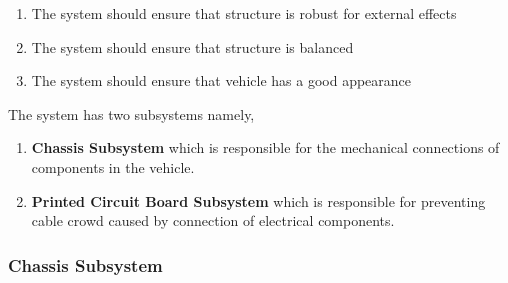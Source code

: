 \documentclass[a4paper,12pt]{article}
\begin{document}
	\begin{enumerate}
		\item The system should	ensure that structure is robust for external effects 
		\item The system should	ensure that structure is balanced
		\item The system should ensure that vehicle has a good appearance
	\end{enumerate}	


	The system has two subsystems namely,
	
	\begin{enumerate}
		\item \textbf{Chassis Subsystem} which is responsible for the mechanical connections of components in the vehicle.
		\item \textbf{Printed Circuit Board Subsystem} which is responsible for preventing cable crowd caused by connection of electrical components.
	\end{enumerate}


\subsubsection{Chassis Subsystem}
\end{document}
